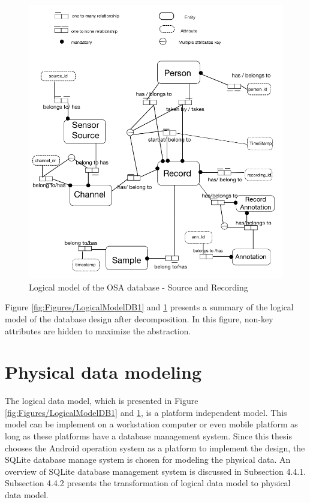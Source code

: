\begin{figure}
    \centering
    \includegraphics[width=1.0\textwidth]{Figures/LogicalModelDB2.png}
    \caption{Logical model of the OSA database - Source and Recording}
    \label{fig:Figures/LogicalModelDB2}
\end{figure}
Figure \ref{fig:Figures/LogicalModelDB1} and \ref{fig:Figures/LogicalModelDB2} presents a summary of the logical model of the database design after decomposition. In this figure, non-key attributes are hidden to maximize the abstraction.
\section{Physical data modeling}
The logical data model, which is presented in Figure \ref{fig:Figures/LogicalModelDB1} and \ref{fig:Figures/LogicalModelDB2}, is a platform independent model. This model can be implement on a workstation computer or even mobile platform as long as these platforms have a database management system. Since this thesis chooses the Android operation system as a platform to implement the design, the SQLite database manage system is chosen for modeling the physical data. An overview of SQLite database management system is discussed in Subsection 4.4.1. Subsection 4.4.2 presents the transformation of logical data model to physical data model.
